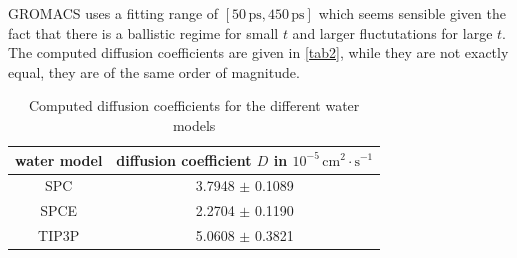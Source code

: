 \documentclass[a4paper,10pt,bibtotoc]{scrartcl}
\begin{document}
GROMACS uses a fitting range of $\left[50\,\mathrm{ps},450\,\mathrm{ps}\right]$ which seems sensible given the fact that there is a ballistic regime for small $t$ and larger fluctutations for large $t$. 
The computed diffusion coefficients are given in \autoref{tab2}, while they are not exactly equal, they are of the same order of magnitude. 

\begin{table}[h]
\centering
\caption{Computed diffusion coefficients for the different water models}
\begin{tabular}{@{}cc@{}}
\toprule
water model & diffusion coefficient $D$ in $10^{-5}\,\mathrm{cm}^2\cdot \mathrm{s}^{-1}$ \\ \midrule
SPC         &          3.7948 $\pm$ 0.1089                 \\
SPCE        &          2.2704 $\pm$ 0.1190            \\
TIP3P       &          5.0608 $\pm$       0.3821    \\ \bottomrule
\end{tabular}
\label{tab2}
\end{table}
\end{document}
